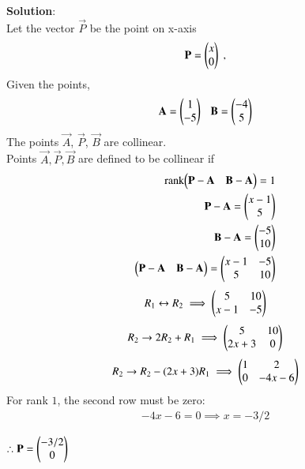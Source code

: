 \documentclass[journal]{IEEEtran}
\begin{document}
\textbf{Solution}:\\
Let the vector $\vec{P}$ be the point on x-axis
\begin{align}
    \vec{P}=\begin{myvec}{x\\0}\end{myvec} \;, 
\end{align}
Given the points,
\begin{align}
    \vec{A}=\begin{myvec}{1\\-5}\end{myvec}\ \ \ 
    \vec{B}=\begin{myvec}{-4\\5}\end{myvec}
\end{align}
\bigskip
The points $\vec{A}$, $\vec{P}$, $\vec{B}$ are collinear.\\
Points $\vec{A}, \vec{P}, \vec{B}$ are defined to be collinear if 
		\begin{align}
			\text{rank}{\ensuremath{\begin{pmatrix}\mathbf{P}-\mathbf{A}& \mathbf{B}-\mathbf{A}\end{pmatrix}}} = 1\\
            \mathbf{P}-\mathbf{A} = \begin{pmatrix}x-1\\5\end{pmatrix}\\
            \mathbf{B}-\mathbf{A} = \begin{pmatrix}-5\\10\end{pmatrix}\\
            \begin{pmatrix}\mathbf{P}-\mathbf{A}& \mathbf{B}-\mathbf{A}\end{pmatrix} = \begin{pmatrix}x-1 & -5\\5 & 10\end{pmatrix}
		\end{align}
\begin{align}
R_1 \leftrightarrow R_2 \implies \begin{pmatrix}5 & 10\\x-1 & -5\end{pmatrix}
\end{align}
\begin{align}
R_2 \rightarrow 2R_2 + R_1 \implies \begin{pmatrix}5 & 10\\2x+3 & 0\end{pmatrix}
\end{align}
\begin{align}
R_2 \rightarrow R_2-(2x+3)R_1 \implies \begin{pmatrix}1 & 2 \\ 0 & -4x-6\end{pmatrix}
\end{align}
For rank $1$, the second row must be zero:
\begin{align}
    -4x-6=0 \implies x=-3/2
\end{align}
\begin{center}
$\therefore \vec{P}=\begin{myvec}{-3/2\\0}\end{myvec}$
\end{center}
\end{document}
